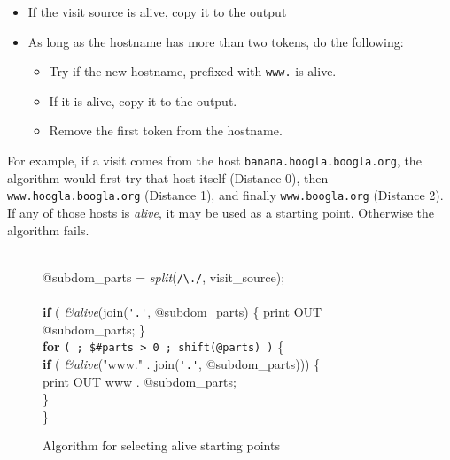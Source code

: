 \documentclass[a4paper]{danarticle}
\theoremstyle{remark}
\begin{document}
       \begin{itemize}
         \item{If the visit source is alive, copy it to the output}
	 \item{As long as the hostname has more than two tokens, do the
	 following:}
	 \begin{itemize}
	   \item{Try if the new hostname, prefixed with \verb$www.$ is alive.}
	   \item{If it is alive, copy it to the output.}
	   \item{Remove the first token from the hostname.}
	 \end{itemize}
       \end{itemize}
       
       For example, if a visit comes from the host
       \verb$banana.hoogla.boogla.org$, the algorithm would first try that
       host itself (Distance 0), then \verb$www.hoogla.boogla.org$ (Distance 1),
       and finally
       \verb$www.boogla.org$ (Distance 2). If any of those hosts is
       \textit{alive}, it may be used as a starting point. Otherwise
       the algorithm fails.
       \begin{figure}[ht]
       {\ttfamily
       \begin{tabbing}
           \hspace{5mm} \= \hspace{5mm} \= \hspace{5mm} \= \hspace{5mm} \= \\
	   @subdom\_parts = \textit{split}(\verb$/\./$, visit\_source); \\
	   \\
	   \textbf{if} ( \textit{\&alive}(join(\verb$'.'$, @subdom\_parts) \{
	   print OUT @subdom\_parts; \} \\
	   \textbf{for} \verb-( ; $#parts > 0 ; shift(@parts) )- \{ \\
	   \>  \textbf{if} ( \textit{\&alive}("www." . join(\verb$'.'$,
    	   @subdom\_parts))) \{ \\
	   \> \> print OUT www . @subdom\_parts; \\
	   \> \} \\
	   \} \\
         \end{tabbing}}
	 \caption{Algorithm for selecting alive starting points}
	 \label{domaintest}
       \end{figure}
\end{document}
